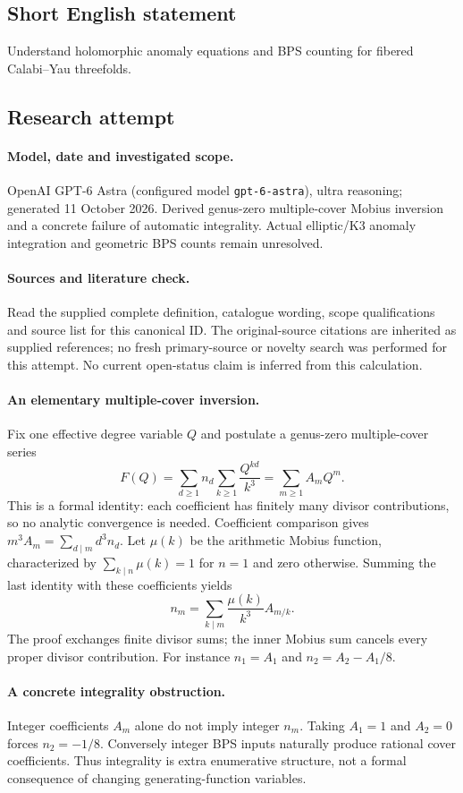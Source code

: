 \documentclass[11pt]{article}
\begin{document}
\subsection{Short English statement}
Understand holomorphic anomaly equations and BPS counting for fibered Calabi–Yau threefolds.
\subsection{Research attempt}
\paragraph{Model, date and investigated scope.}
OpenAI GPT-6 Astra (configured model \texttt{gpt-6-astra}), ultra reasoning; generated 11 October 2026. Derived genus-zero multiple-cover Mobius inversion and a concrete failure of automatic integrality. Actual elliptic/K3 anomaly integration and geometric BPS counts remain unresolved.

\paragraph{Sources and literature check.}
Read the supplied complete definition, catalogue wording, scope qualifications and source list for this canonical ID. The original-source citations are inherited as supplied references; no fresh primary-source or novelty search was performed for this attempt. No current open-status claim is inferred from this calculation.

\paragraph{An elementary multiple-cover inversion.}Fix one effective degree variable \(Q\) and postulate a genus-zero multiple-cover series
\[F(Q)=\sum_{d\ge1}n_d\sum_{k\ge1}\frac{Q^{kd}}{k^3}=\sum_{m\ge1}A_mQ^m.
\]
This is a formal identity: each coefficient has finitely many divisor contributions, so no analytic convergence is needed. Coefficient comparison gives \(m^3A_m=\sum_{d\mid m}d^3n_d\). Let \(\mu(k)\) be the arithmetic Mobius function, characterized by \(\sum_{k\mid n}\mu(k)=1\) for \(n=1\) and zero otherwise. Summing the last identity with these coefficients yields
\[n_m=\sum_{k\mid m}\frac{\mu(k)}{k^3}A_{m/k}.
\]
The proof exchanges finite divisor sums; the inner Mobius sum cancels every proper divisor contribution. For instance \(n_1=A_1\) and \(n_2=A_2-A_1/8\).
\paragraph{A concrete integrality obstruction.}Integer coefficients \(A_m\) alone do not imply integer \(n_m\). Taking \(A_1=1\) and \(A_2=0\) forces \(n_2=-1/8\). Conversely integer BPS inputs naturally produce rational cover coefficients. Thus integrality is extra enumerative structure, not a formal consequence of changing generating-function variables.
\end{document}

